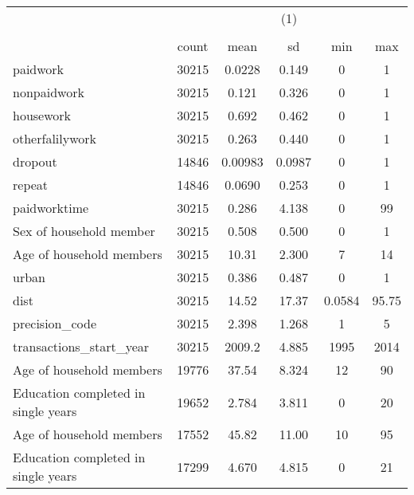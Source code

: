 {
\def\sym#1{\ifmmode^{#1}\else\(^{#1}\)\fi}
\begin{tabular}{l*{1}{ccccc}}
\toprule
                    &\multicolumn{5}{c}{(1)}                                         \\
                    &\multicolumn{5}{c}{}                                            \\
                    &       count&        mean&          sd&         min&         max\\
\midrule
paidwork            &       30215&      0.0228&       0.149&           0&           1\\
nonpaidwork         &       30215&       0.121&       0.326&           0&           1\\
housework           &       30215&       0.692&       0.462&           0&           1\\
otherfalilywork     &       30215&       0.263&       0.440&           0&           1\\
dropout             &       14846&     0.00983&      0.0987&           0&           1\\
repeat              &       14846&      0.0690&       0.253&           0&           1\\
paidworktime        &       30215&       0.286&       4.138&           0&          99\\
Sex of household member&       30215&       0.508&       0.500&           0&           1\\
Age of household members&       30215&       10.31&       2.300&           7&          14\\
urban               &       30215&       0.386&       0.487&           0&           1\\
dist                &       30215&       14.52&       17.37&      0.0584&       95.75\\
precision\_code      &       30215&       2.398&       1.268&           1&           5\\
transactions\_start\_year&       30215&      2009.2&       4.885&        1995&        2014\\
Age of household members&       19776&       37.54&       8.324&          12&          90\\
Education completed in single years&       19652&       2.784&       3.811&           0&          20\\
Age of household members&       17552&       45.82&       11.00&          10&          95\\
Education completed in single years&       17299&       4.670&       4.815&           0&          21\\
\bottomrule
\end{tabular}
}
